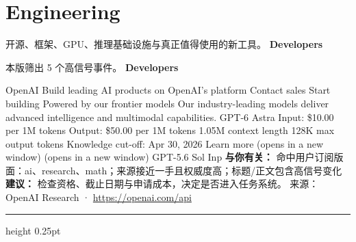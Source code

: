 \documentclass[10.5pt]{ctexart}
\begin{document}
\section*{Engineering}
{\color{ormuted} 开源、框架、GPU、推理基础设施与真正值得使用的新工具。}
\vspace{2mm}
{\LARGE\bfseries Developers}\par
\vspace{1mm}
{\color{ormuted} 本版筛出 5 个高信号事件。}
\vspace{3mm}
{\Large\bfseries Developers}\par
OpenAI Build leading AI products on OpenAI’s platform Contact sales Start building Powered by our frontier models Our industry-leading models deliver advanced intelligence and multimodal capabilities. GPT-6 Astra Input: \$10.00 per 1M tokens Output: \$50.00 per 1M tokens 1.05M context length 128K max output tokens Knowledge cut-off: Apr 30, 2026 Learn more (opens in a new window) (opens in a new window) GPT-5.6 Sol Inp
\textbf{与你有关：} 命中用户订阅版面：ai、research、math；来源接近一手且权威度高；标题/正文包含高信号变化
\textbf{建议：} 检查资格、截止日期与申请成本，决定是否进入任务系统。
{\footnotesize\color{ormuted} 来源：OpenAI Research · \url{https://openai.com/api}}
\vspace{4mm}
\hrule height 0.25pt
\vspace{3mm}
\end{document}
